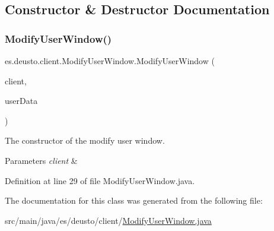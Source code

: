 \subsection{Constructor \& Destructor Documentation}
\mbox{\label{classes_1_1deusto_1_1client_1_1_modify_user_window_aa3748a01efbae39f32f99255a13e5d39}} 
\subsubsection{\texorpdfstring{Modify\+User\+Window()}{ModifyUserWindow()}}
{\footnotesize\ttfamily es.\+deusto.\+client.\+Modify\+User\+Window.\+Modify\+User\+Window (\begin{DoxyParamCaption}\item[{\hyperlink{classes_1_1deusto_1_1client_1_1_example_client}{Example\+Client}}]{client,  }\item[{\hyperlink{classes_1_1deusto_1_1serialization_1_1_user_data}{User\+Data}}]{user\+Data }\end{DoxyParamCaption})}

The constructor of the modify user window. ~\newline

\begin{DoxyParams}{Parameters}
{\em client} & \\
\hline
\end{DoxyParams}


Definition at line 29 of file Modify\+User\+Window.\+java.



The documentation for this class was generated from the following file\+:\begin{DoxyCompactItemize}
\item 
src/main/java/es/deusto/client/\hyperlink{_modify_user_window_8java}{Modify\+User\+Window.\+java}\end{DoxyCompactItemize}
